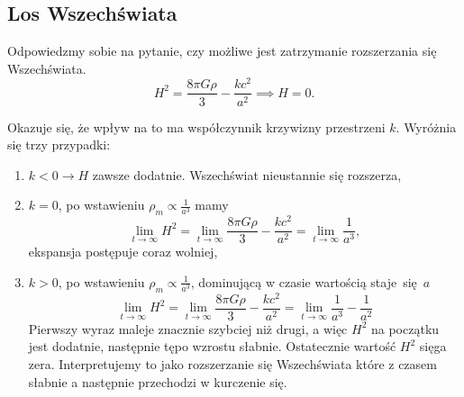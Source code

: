 \documentclass[12pt]{article}
\begin{document}
	\subsection{Los Wszechświata}
	Odpowiedzmy sobie na pytanie, czy możliwe jest zatrzymanie rozszerzania się Wszechświata.
	\begin{equation}
		H^2 = \frac{8\pi G \rho}{3} - \frac{k c^2}{a^2} \implies H = 0.
	\end{equation}
	
	Okazuje się, że wpływ na to ma współczynnik krzywizny przestrzeni $k$. Wyróżnia się trzy przypadki:
	\begin{enumerate}
		\item $k < 0 \rightarrow H$ zawsze dodatnie. Wszechświat nieustannie się rozszerza,
		\item $k = 0$, po wstawieniu $\rho_{m} \propto \frac{1}{a^3}$ mamy
		\begin{equation}
			\lim\limits_{t \rightarrow \infty} H^2 = \lim\limits_{t \rightarrow \infty} \frac{8\pi G \rho}{3} - \frac{k c^2}{a^2} = \lim\limits_{t \rightarrow \infty} \frac{1}{a^3},
		\end{equation} ekspansja postępuje coraz wolniej,
		\item $k > 0$, po wstawieniu $\rho_{m} \propto \frac{1}{a^3}$, dominującą w czasie wartością staje~się~$a$
		\begin{equation}
			\lim\limits_{t \rightarrow \infty} H^2 = \lim\limits_{t \rightarrow \infty} \frac{8\pi G \rho}{3} - \frac{k c^2}{a^2} = \lim\limits_{t \rightarrow \infty} \frac{1}{a^3} - \frac{1}{a^2}
		\end{equation}
		Pierwszy wyraz maleje znacznie szybciej niż drugi, a więc $H^2$ na początku jest dodatnie, następnie tępo wzrostu słabnie. Ostatecznie wartość $H^2$ sięga zera. Interpretujemy to jako rozszerzanie się Wszechświata które z czasem słabnie a następnie przechodzi w kurczenie się.
		
		
	\end{enumerate}
	
	
\end{document}
